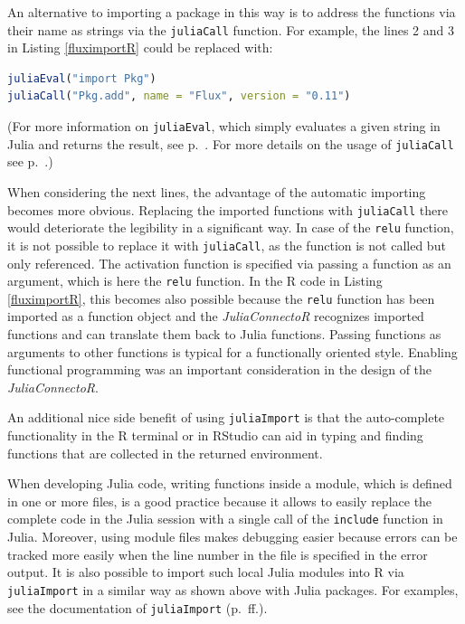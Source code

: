 \documentclass[12pt]{article}
\newcommand{\inlinecode}[1]{\texttt{#1}}
\newcommand{\apkg}[1]{\emph{#1}}
\begin{document}
An alternative to importing a package in this way is to address the functions via their name as strings via the \inlinecode{juliaCall} function. 
For example, the lines 2 and 3 in Listing \ref{fluximportR} could be replaced with:
\begin{lstlisting}[language=R]
juliaEval("import Pkg")
juliaCall("Pkg.add", name = "Flux", version = "0.11") 
\end{lstlisting}
(For more information on \inlinecode{juliaEval}, which simply evaluates a given string in Julia and returns the result, see p.~\pageref{rdokitem_juliaEval}. 
For more details on the usage of \inlinecode{juliaCall} see p.~\pageref{rdokitem_juliaCall}.)

When considering the next lines, the advantage of the automatic importing becomes more obvious.
Replacing the imported functions with \inlinecode{juliaCall} there would deteriorate the legibility in a significant way.
In case of the \inlinecode{relu} function, it is not possible to replace it with \inlinecode{juliaCall}, as the function is not called but only referenced.
The activation function is specified via passing a function as an argument, which is here the \inlinecode{relu} function.
In the R code in Listing \ref{fluximportR}, this becomes also possible because the \inlinecode{relu} function has been imported as a function object and the \apkg{JuliaConnectoR} recognizes imported functions and can translate them back to Julia functions.
Passing functions as arguments to other functions is typical for a functionally oriented style.
Enabling functional programming was an important consideration in the design of the \apkg{JuliaConnectoR}.

An additional nice side benefit of using \inlinecode{juliaImport} is that the auto-complete functionality in the R terminal or in RStudio can aid in typing and finding functions that are collected in the returned environment.

When developing Julia code, writing functions inside a module, which is defined in one or more files, is a good practice because it allows to easily replace the complete code in the Julia session with a single call of the \inlinecode{include} function in Julia.
Moreover, using module files makes debugging easier because errors can be tracked more easily when the line number in the file is specified in the error output.
It is also possible to import such local Julia modules into R via \inlinecode{juliaImport} in a similar way as shown above with Julia packages.
For examples, see the documentation of \inlinecode{juliaImport} (p.~\pageref{rdokitem_juliaImport}ff.).
\end{document}
